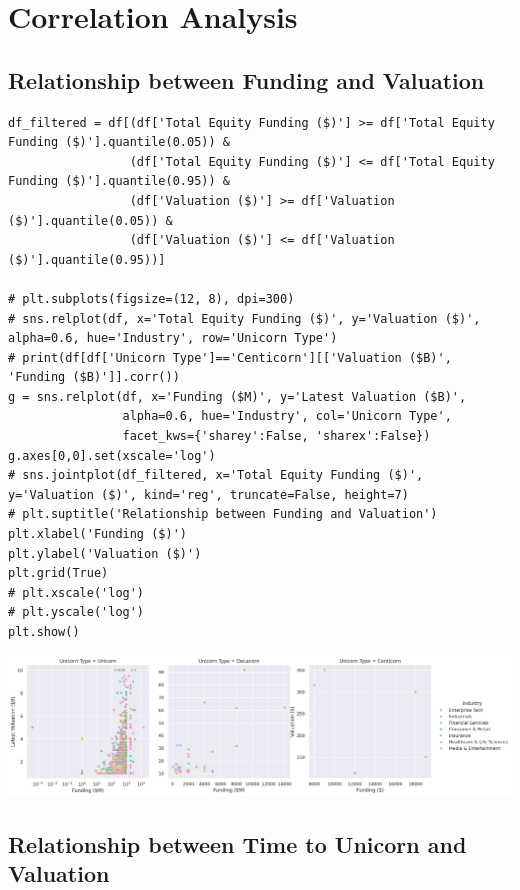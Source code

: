 \documentclass[a4paper,12pt]{article}
\begin{document}
\section{Correlation Analysis}
\label{sec:orgcfc5965}
\subsection{Relationship between Funding and Valuation}
\label{sec:org6371ab3}

\begin{verbatim}
df_filtered = df[(df['Total Equity Funding ($)'] >= df['Total Equity Funding ($)'].quantile(0.05)) &
                 (df['Total Equity Funding ($)'] <= df['Total Equity Funding ($)'].quantile(0.95)) &
                 (df['Valuation ($)'] >= df['Valuation ($)'].quantile(0.05)) &
                 (df['Valuation ($)'] <= df['Valuation ($)'].quantile(0.95))]

# plt.subplots(figsize=(12, 8), dpi=300)
# sns.relplot(df, x='Total Equity Funding ($)', y='Valuation ($)', alpha=0.6, hue='Industry', row='Unicorn Type')
# print(df[df['Unicorn Type']=='Centicorn'][['Valuation ($B)', 'Funding ($B)']].corr())
g = sns.relplot(df, x='Funding ($M)', y='Latest Valuation ($B)',
                alpha=0.6, hue='Industry', col='Unicorn Type',
                facet_kws={'sharey':False, 'sharex':False})
g.axes[0,0].set(xscale='log')
# sns.jointplot(df_filtered, x='Total Equity Funding ($)', y='Valuation ($)', kind='reg', truncate=False, height=7)
# plt.suptitle('Relationship between Funding and Valuation')
plt.xlabel('Funding ($)')
plt.ylabel('Valuation ($)')
plt.grid(True)
# plt.xscale('log')
# plt.yscale('log')
plt.show()
\end{verbatim}

\begin{center}
\includegraphics[width=.9\linewidth]{./.ob-jupyter/192589265a76e100ac55302b2ccbbe97c9b59c3c.png}
\label{}
\end{center}
\subsection{Relationship between Time to Unicorn and Valuation}
\label{sec:orgeeaf30d}
\end{document}
